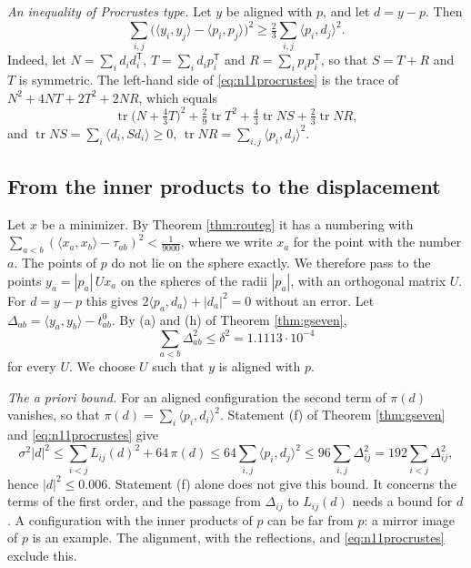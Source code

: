 \documentclass[reqno,a4paper,11pt]{amsart}
\numberwithin{equation}{section}
\begin{document}
\emph{An inequality of Procrustes type.} Let $y$ be aligned with $p$, and let $d = y - p$. Then
\begin{equation}\label{eq:n11procrustes}
\sum_{i,j} \bigl( \langle y_i, y_j \rangle - \langle p_i, p_j \rangle \bigr)^2 \geq \tfrac23 \sum_{i,j} \langle p_i, d_j \rangle^2 .
\end{equation}
Indeed, let $N = \sum_i d_i d_i^{\mathsf T}$, $T = \sum_i d_i p_i^{\mathsf T}$ and $R = \sum_i p_i p_i^{\mathsf T}$, so that $S = T + R$ and $T$ is symmetric. The left-hand side of \eqref{eq:n11procrustes} is the trace of $N^2 + 4 N T + 2 T^2 + 2 N R$, which equals
$$
\operatorname{tr} \bigl( N + \tfrac43 T \bigr)^2 + \tfrac29 \operatorname{tr} T^2 + \tfrac43 \operatorname{tr} N S + \tfrac23 \operatorname{tr} N R ,
$$
and $\operatorname{tr} N S = \sum_i \langle d_i, S d_i \rangle \geq 0$, $\operatorname{tr} N R = \sum_{i,j} \langle p_i, d_j \rangle^2$.

\subsection{From the inner products to the displacement}

Let $x$ be a minimizer. By Theorem \ref{thm:routeg} it has a numbering with $\sum_{a<b} ( \langle x_a, x_b \rangle - \tau_{ab} )^2 < \tfrac{1}{9000}$, where we write $x_a$ for the point with the number $a$. The points of $p$ do not lie on the sphere exactly. We therefore pass to the points $y_a = |p_a| \, U x_a$ on the spheres of the radii $|p_a|$, with an orthogonal matrix $U$. For $d = y - p$ this gives $2 \langle p_a, d_a \rangle + |d_a|^2 = 0$ without an error. Let $\Delta_{ab} = \langle y_a, y_b \rangle - t^0_{ab}$. By (a) and (h) of Theorem \ref{thm:gseven},
$$
\sum_{a<b} \Delta_{ab}^2 \leq \delta^2 = 1.1113 \cdot 10^{-4}
$$
for every $U$. We choose $U$ such that $y$ is aligned with $p$.

\emph{The a priori bound.} For an aligned configuration the second term of $\pi(d)$ vanishes, so that $\pi(d) = \sum_i \langle p_i, d_i \rangle^2$. Statement (f) of Theorem \ref{thm:gseven} and \eqref{eq:n11procrustes} give
$$
\sigma^2 |d|^2 \leq \sum_{i<j} L_{ij}(d)^2 + 64 \, \pi(d) \leq 64 \sum_{i,j} \langle p_i, d_j \rangle^2 \leq 96 \sum_{i,j} \Delta_{ij}^2 = 192 \sum_{i<j} \Delta_{ij}^2 ,
$$
hence $|d|^2 \leq 0.006$. Statement (f) alone does not give this bound. It concerns the terms of the first order, and the passage from $\Delta_{ij}$ to $L_{ij}(d)$ needs a bound for $d$. A configuration with the inner products of $p$ can be far from $p$: a mirror image of $p$ is an example. The alignment, with the reflections, and \eqref{eq:n11procrustes} exclude this.
\end{document}
